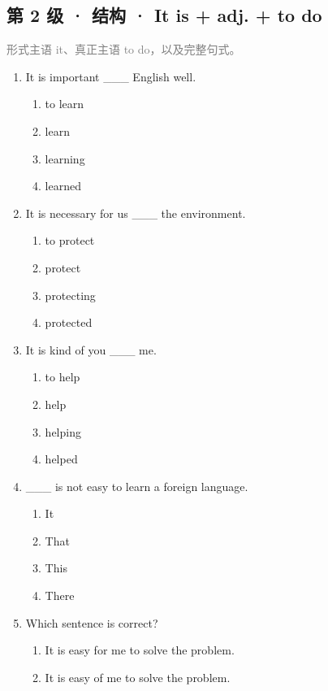 \documentclass[11pt,a4paper]{ctexart}
\begin{document}
\subsection*{第 2 级 · 结构 · It is + adj. + to do}
\noindent\textcolor{gray}{形式主语 it、真正主语 to do，以及完整句式。}\par\smallskip
\begin{enumerate}[leftmargin=*,itemsep=4pt]
\item It is important \_\_\_ English well.
\begin{enumerate}[label=\Alph*.,leftmargin=2em,itemsep=1pt,topsep=2pt]
\item to learn
\item learn
\item learning
\item learned
\end{enumerate}
\item It is necessary for us \_\_\_ the environment.
\begin{enumerate}[label=\Alph*.,leftmargin=2em,itemsep=1pt,topsep=2pt]
\item to protect
\item protect
\item protecting
\item protected
\end{enumerate}
\item It is kind of you \_\_\_ me.
\begin{enumerate}[label=\Alph*.,leftmargin=2em,itemsep=1pt,topsep=2pt]
\item to help
\item help
\item helping
\item helped
\end{enumerate}
\item \_\_\_ is not easy to learn a foreign language.
\begin{enumerate}[label=\Alph*.,leftmargin=2em,itemsep=1pt,topsep=2pt]
\item It
\item That
\item This
\item There
\end{enumerate}
\item Which sentence is correct?
\begin{enumerate}[label=\Alph*.,leftmargin=2em,itemsep=1pt,topsep=2pt]
\item It is easy for me to solve the problem.
\item It is easy of me to solve the problem.

\end{enumerate}
\end{enumerate}
\end{document}
